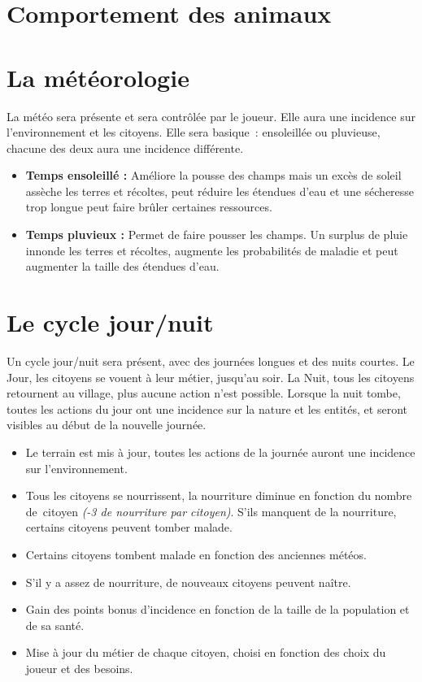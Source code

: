 \documentclass[a4paper]{article}
\begin{document}

    \section{Comportement des animaux}


    \section{La météorologie}
      La météo sera présente et sera contrôlée par le joueur. Elle aura une incidence sur l'environnement et les citoyens. Elle sera basique : ensoleillée ou pluvieuse, chacune des deux aura une incidence différente. 
      \begin{itemize}
        \item \textbf{Temps ensoleillé :} \small{ Améliore la pousse des champs mais un excès de soleil assèche les terres et récoltes, peut réduire les étendues d'eau et une sécheresse trop longue peut faire brûler certaines ressources.}
        \item \textbf{Temps pluvieux :} \small{ Permet de faire pousser les champs. Un surplus de pluie innonde les terres et récoltes, augmente les probabilités de maladie et peut augmenter la taille des étendues d'eau.}
      \end{itemize}


    \section{Le cycle jour/nuit}
      Un cycle jour/nuit sera présent, avec des journées longues et des nuits courtes. Le Jour, les citoyens se vouent à leur métier, jusqu'au soir. La Nuit, tous les citoyens retournent au village, plus aucune action n'est possible. Lorsque la nuit tombe, toutes les actions du jour ont une incidence sur la nature et les entités, et seront visibles au début de la nouvelle journée.
      \begin{itemize} \small
        \item Le terrain est mis à jour, toutes les actions de la journée auront une incidence sur l'environnement.
        \item Tous les citoyens se nourrissent, la nourriture diminue en fonction du nombre de citoyen \textit{(-3 de nourriture par citoyen)}. S'ils manquent de la nourriture, certains citoyens peuvent tomber malade.
        \item Certains citoyens tombent malade en fonction des anciennes météos.
        \item S'il y a assez de nourriture, de nouveaux citoyens peuvent naître.
        \item Gain des points bonus d'incidence en fonction de la taille de la population et de sa santé.
        \item Mise à jour du métier de chaque citoyen, choisi en fonction des choix du joueur et des besoins.
      \end{itemize} \normalsize
\end{document}
